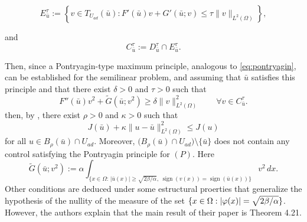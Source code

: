 \[
E_{\bar u}^{\tau}
:=
\left\{
v \in T_{U_{ad}}(\bar u) :
F'(\bar u)v + G'(\bar u;v)
\le \tau \|v\|_{L^2(\Omega)}
\right\},
\]

and
\[
C_{\bar u}^{\tau}
:=
D_{\bar u}^{\tau} \cap E_{\bar u}^{\tau}.
\]

Then, since a Pontryagin-type maximum principle, analogous to 
\eqref{eq:pontryagin}, can be established for the semilinear problem, and 
assuming that $\bar u$ satisfies this principle and that there exist 
$\delta > 0$ and $\tau > 0$ such that
\[
F''(\bar u)v^2 + \tilde G(\bar u;v^2)
\ge \delta \|v\|_{L^2(\Omega)}^2
\qquad \forall v \in C_{\bar u}^{\tau}.
\]
then, by \cite[Theorem 4.21]{casasl0}, there exist $\rho > 0$ and 
$\kappa > 0$ such that
\[
J(\bar u) + \kappa \|u-\bar u\|_{L^2(\Omega)}^2
\le J(u)
\]
for all $u \in B_\rho(\bar u)\cap U_{ad}$.
Moreover, $\big( B_\rho(\bar u)\cap U_{ad} \big)\setminus \{\bar u\}$ does not contain any control satisfying the Pontryagin principle for $(P)$. Here 
\[
\tilde G(\bar u; v^2)
:=
\alpha
\int_{\{x \in \Omega:\, |\bar u(x)| \ge \sqrt{2\beta/\alpha},\;
\operatorname{sign}(v(x))=\operatorname{sign}(\bar u(x))\}}
v^2 \, dx.
\]
Other conditions are deduced under some estructural proerties that
generalize the hypothesis of the nullity of the measure of the set
$\{x\in\Omega: |\varphi(x)| = \sqrt{2\beta/\alpha}\}$. However, the authors
explain that the main result of their paper is Theorem 4.21. 


 
	




